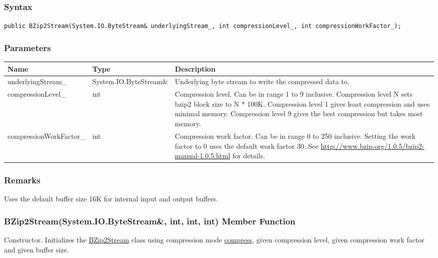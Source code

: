 \documentclass[a4paper,oneside,11.000000pt]{book}
\begin{document}
\subsubsection*{Syntax}
\texttt{public BZip2Stream(System.IO.ByteStream\& underlyingStream\_, int compressionLevel\_, int compressionWorkFactor\_);}
\subsubsection*{Parameters}
\begin{flushleft}
\begin{supertabular}[l]{!{\raggedright}p{4.93333cm}!{\raggedright}p{4.93333cm}!{\raggedright}p{4.93333cm}}
\textbf{Name}
& \textbf{Type}
& \textbf{Description}
\\
\hline
underlyingStream\_
& System.\-IO.\-ByteStream\&\-
& Underlying byte stream to write the compressed data to.

\\
compressionLevel\_
& int
& Compression level. Can be in range 1 to 9 inclusive. Compression level N sets bzip2 block size to N * 100K.
Compression level 1 gives least compression and uses minimal memory.
Compression level 9 gives the best compression but takes most memory.

\\
compressionWorkFactor\_
& int
& Compression work factor. Can be in range 0 to 250 inclusive. Setting the work factor to 0 uses the default work factor 30.
See \url{http://www.bzip.org/1.0.5/bzip2-manual-1.0.5.html} for details.

\\
\end{supertabular}

\end{flushleft}
\subsubsection*{Remarks}
\begin{flushleft}
Uses the default buffer size 16K for internal input and output buffers.

\end{flushleft}
\clearpage

\hypertarget{System.IO.Compression.BZip2Stream.constructor.P.System.IO.Compression.BZip2Stream.R.System.IO.ByteStream.int.int.int}{\subsubsection*{BZip2Stream(System.IO.ByteStream\&, int, int, int) Member Function}}
\begin{flushleft}
Constructor. Initializes the \hyperlink{System.IO.Compression.BZip2Stream}{BZip2Stream} class using compression mode \hyperlink{System.IO.Compression.CompressionMode.compress}{compress},
given compression level, given compression work factor and given buffer size.

\end{flushleft}
\end{document}
